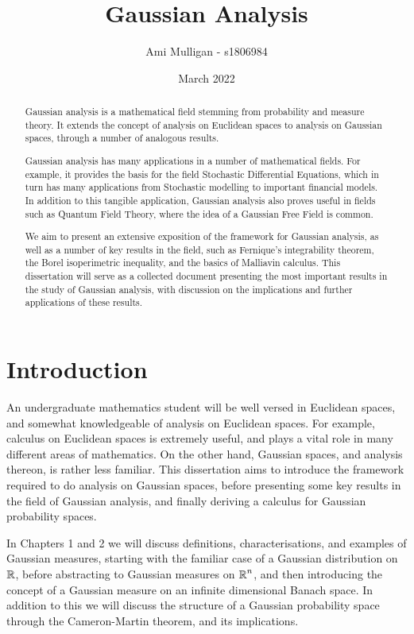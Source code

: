 \documentclass[12pt]{report}
\title{Gaussian Analysis}
\author{Ami Mulligan - s1806984}
\date{March 2022}
\begin{document}
\maketitle
\begin{abstract}
Gaussian analysis is a mathematical field stemming from probability and measure theory. It extends the concept of analysis on Euclidean spaces to analysis on Gaussian spaces, through a number of analogous results. 

Gaussian analysis has many applications in a number of mathematical fields. For example, it provides the basis for the field Stochastic Differential Equations, which in turn has many applications from Stochastic modelling to important financial models. In addition to this tangible application, Gaussian analysis also proves useful in fields such as Quantum Field Theory, where the idea of a Gaussian Free Field is common.

We aim to present an extensive exposition of the framework for Gaussian analysis, as well as a number of key results in the field, such as Fernique's integrability theorem, the Borel isoperimetric inequality, and the basics of Malliavin calculus. This dissertation will serve as a collected document presenting the most important results in the study of Gaussian analysis, with discussion on the implications and further applications of these results.
\end{abstract}
\declaration
\dedication{I would like to thank Ilya Chevyerev for all the help that he has provided throughout the course of this dissertation, from research to writing.}
\tableofcontents
\newpage
{}

\chapter*{Introduction}
An undergraduate mathematics student will be well versed in Euclidean spaces, and somewhat knowledgeable of analysis on Euclidean spaces. For example, calculus on Euclidean spaces is extremely useful, and plays a vital role in many different areas of mathematics. On the other hand, Gaussian spaces, and analysis thereon, is rather less familiar. This dissertation aims to introduce the framework required to do analysis on Gaussian spaces, before presenting some key results in the field of Gaussian analysis, and finally deriving a calculus for Gaussian probability spaces. 

In Chapters 1 and 2 we will discuss definitions, characterisations, and examples of Gaussian measures, starting with the familiar case of a Gaussian distribution on $\operatorname{\mathbb{R}}$, before abstracting to Gaussian measures on $\operatorname{\mathbb{R}}^n$, and then introducing the concept of a Gaussian measure on an infinite dimensional Banach space. In addition to this we will discuss the structure of a Gaussian probability space through the Cameron-Martin theorem, and its implications.
\end{document}
